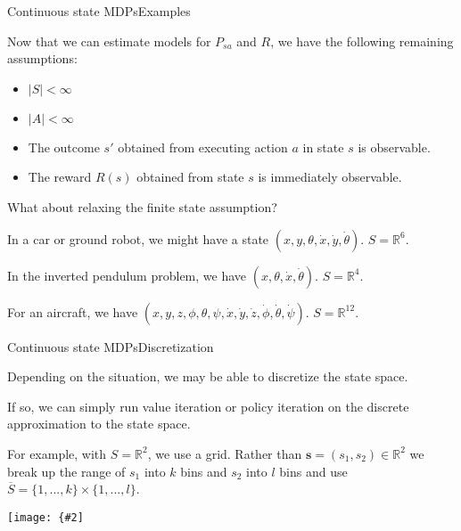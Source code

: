 \documentclass{beamer}
\renewcommand{\vec}[1]{\boldsymbol{#1}}
\def\Rset{\mathbb{R}}
\newcommand{\myfig}[3]{\centerline{\texttt{[image: \{\#2]}}}
    \centerline{\scriptsize #3}}
\begin{document}
\begin{frame}{Continuous state MDPs}{Examples}

  Now that we can estimate models for $P_{sa}$ and $R$, we have
  the following remaining assumptions:
  \begin{itemize}
  \item $|S| < \infty$
  \item $|A| < \infty$
  \item The outcome $s'$ obtained from executing action $a$ in state
    $s$ is observable.
  \item The reward $R(s)$ obtained from state $s$ is immediately
    observable.
  \end{itemize}

  \medskip

  What about \alert{relaxing the finite state assumption}?

  \medskip

  In a car or ground robot, we might have a state
  $(x,y,\theta,\dot{x},\dot{y},\dot{\theta})$. $S = \Rset^6$.

  \medskip

  In the inverted pendulum problem, we have
  $(x,\theta,\dot{x},\dot{\theta})$. $S=\Rset^4$.

  \medskip

  For an aircraft, we have $(x,y,z,\phi,\theta,\psi,\dot{x},\dot{y},\dot{z},\dot{\phi},\dot{\theta},\dot{\psi})$. $S = \Rset^{12}$.

\end{frame}


\begin{frame}{Continuous state MDPs}{Discretization}

  Depending on the situation, we may be able to \alert{discretize} the state space.

  \medskip

  If so, we can simply run value iteration or policy iteration on the
  discrete approximation to the state space.

  \medskip

  For example, with $S=\Rset^2$, we use a \alert{grid}. Rather than $\vec{s} = (s_1,s_2) \in \Rset^2$ we break up the range of $s_1$ into $k$ bins and $s_2$ into $l$ bins and use $\overline{S} = \{1,...,k\}\times \{1,...,l\}$.

  \medskip

  \myfig{1.5in}{ng-discrete}{Ng (2017), CS 229 lecture notes, set 12}
  
\end{frame}
\end{document}
